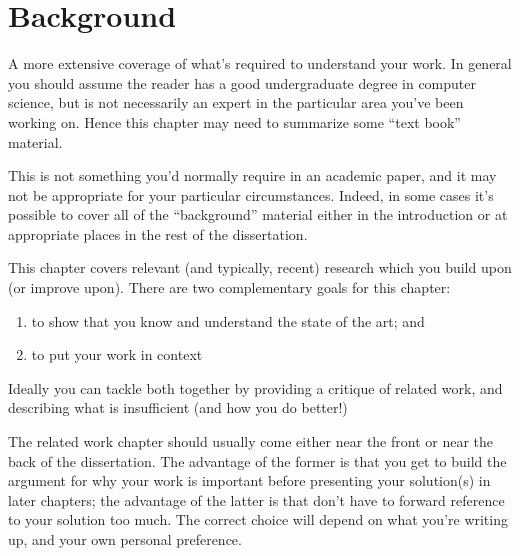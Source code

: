 \chapter{Background}

A more extensive coverage of what's required to understand your work.
In general you should assume the reader has a good undergraduate
degree in computer science, but is not necessarily an expert in the
particular area you've been working on. Hence this chapter may need to
summarize some ``text book'' material.

This is not something you'd normally require in an academic paper, and
it may not be appropriate for your particular circumstances. Indeed,
in some cases it's possible to cover all of the ``background''
material either in the introduction or at appropriate places in the
rest of the dissertation.


This chapter covers relevant (and typically, recent) research
which you build upon (or improve upon). There are two complementary
goals for this chapter:
\begin{enumerate}
    \item to show that you know and understand the state of the art; and
    \item to put your work in context
\end{enumerate}

Ideally you can tackle both together by providing a critique of
related work, and describing what is insufficient (and how you do
better!)

The related work chapter should usually come either near the front or
near the back of the dissertation. The advantage of the former is that
you get to build the argument for why your work is important before
presenting your solution(s) in later chapters; the advantage of the
latter is that don't have to forward reference to your solution too
much. The correct choice will depend on what you're writing up, and
your own personal preference.